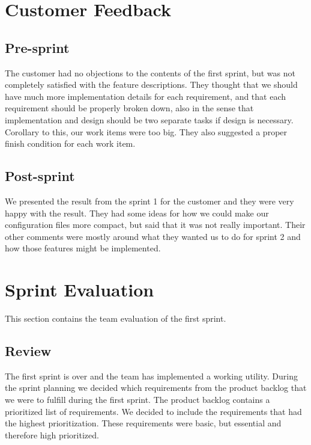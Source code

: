 \section{Customer Feedback}

\subsection{Pre-sprint}
The customer had no objections to the contents of the first sprint, but was not
completely satisfied with the feature descriptions. They thought that we should
have much more implementation details for each requirement, and that each
requirement should be properly broken down, also in the sense that
implementation and design should be two separate tasks if design is necessary.
Corollary to this, our work items were too big. They also suggested a proper
finish condition for each work item.

\subsection{Post-sprint}
We presented the result from the sprint 1 for the customer and they were very
happy with the result. They had some ideas for how we could make our
configuration files more compact, but said that it was not really important.
Their other comments were mostly around what they wanted us to do for sprint 2
and how those features might be implemented.


\section{Sprint Evaluation}
This section contains the team evaluation of the first sprint.

\subsection{Review}
The first sprint is over and the team has implemented a working utility. During
the sprint planning we decided which requirements from the product backlog that
we were to fulfill during the first sprint. The product backlog contains a
prioritized list of requirements. We decided to include the requirements that
had the highest prioritization. These requirements were basic, but essential
and therefore high prioritized.
   

